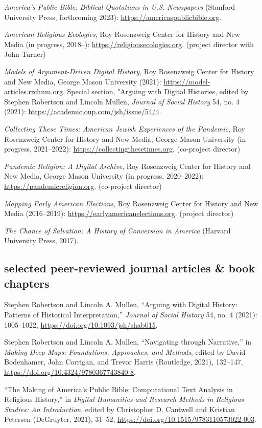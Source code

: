 \documentclass[11pt]{article}
\begin{document}
\emph{America's Public Bible: Biblical Quotations in U.S. Newspapers} (Stanford University Press, forthcoming 2023): \url{https://americaspublicbible.org}.

\emph{American Religious Ecologies}, Roy Rosenzweig Center for History and New Media (in progress, 2018--): \url{https://religiousecologies.org}. (project director with John Turner)

\emph{Models of Argument-Driven Digital History}, Roy Rosenzweig Center for History and New Media, George Mason University (2021): \url{https://model-articles.rrchnm.org}. Special section, "Arguing with Digital Histories, edited by Stephen Robertson and Lincoln Mullen, \emph{Journal of Social History} 54, no. 4 (2021): \url{https://academic.oup.com/jsh/issue/54/4}. 

\emph{Collecting These Times: American Jewish Experiences of the Pandemic}, Roy Rosenzweig Center for History and New Media, George Mason University (in progress, 2021--2022): \url{https://collectingthesetimes.org}. (co-project director)

\emph{Pandemic Religion: A Digital Archive}, Roy Rosenzweig Center for History and New Media, George Mason University (in progress, 2020--2022): \url{https://pandemicreligion.org}. (co-project director)

\emph{Mapping Early American Elections}, Roy Rosenzweig Center for History and New Media (2016--2019): \url{https://earlyamericanelections.org}. (project director)

\emph{The Chance of Salvation: A History of Conversion in America} (Harvard University Press, 2017).

\subsection{selected peer-reviewed journal articles \& book chapters}\label{peer-reviewed}

Stephen Robertson and Lincoln A. Mullen, ``Arguing with Digital History: Patterns of Historical Interpretation,'' \emph{Journal of Social History} 54, no. 4 (2021): 1005--1022, \url{https://doi.org/10.1093/jsh/shab015}.

Stephen Robertson and Lincoln A. Mullen, ``Navigating through Narrative,'' in \emph{Making Deep Maps: Foundations, Approaches, and Methods}, edited by David Bodenhamer, John Corrigan, and Trevor Harris (Routledge, 2021), 132--147, \url{https://doi.org/10.4324/9780367743840-8}.

``The Making of America's Public Bible: Computational Text Analysis in Religious History,'' in \emph{Digital Humanities and Research Methods in Religious Studies: An Introduction}, edited by Christopher D. Cantwell and Kristian Petersen (DeGruyter, 2021), 31--52, \url{https://doi.org/10.1515/9783110573022-003}.
\end{document}
